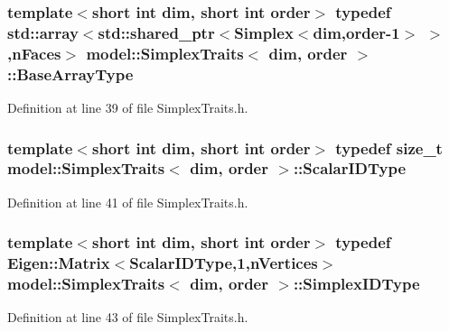 \subsubsection[{Base\+Array\+Type}]{\setlength{\rightskip}{0pt plus 5cm}template$<$short int dim, short int order$>$ typedef std\+::array$<$std\+::shared\+\_\+ptr$<${\bf Simplex}$<${\bf dim},order-\/1$>$ $>$,{\bf n\+Faces}$>$ {\bf model\+::\+Simplex\+Traits}$<$ {\bf dim}, order $>$\+::{\bf Base\+Array\+Type}}\label{structmodel_1_1_simplex_traits_a57cfde9abd77073f1512baf404bbb328}


Definition at line 39 of file Simplex\+Traits.\+h.

\hypertarget{structmodel_1_1_simplex_traits_ab229f3d4d4f2bf8205fa73777b4412a9}{}
\subsubsection[{Scalar\+I\+D\+Type}]{\setlength{\rightskip}{0pt plus 5cm}template$<$short int dim, short int order$>$ typedef size\+\_\+t {\bf model\+::\+Simplex\+Traits}$<$ {\bf dim}, order $>$\+::{\bf Scalar\+I\+D\+Type}}\label{structmodel_1_1_simplex_traits_ab229f3d4d4f2bf8205fa73777b4412a9}


Definition at line 41 of file Simplex\+Traits.\+h.

\hypertarget{structmodel_1_1_simplex_traits_aea38aba3da1babde2d5f0c62f7862eae}{}
\subsubsection[{Simplex\+I\+D\+Type}]{\setlength{\rightskip}{0pt plus 5cm}template$<$short int dim, short int order$>$ typedef Eigen\+::\+Matrix$<${\bf Scalar\+I\+D\+Type},1,{\bf n\+Vertices}$>$ {\bf model\+::\+Simplex\+Traits}$<$ {\bf dim}, order $>$\+::{\bf Simplex\+I\+D\+Type}}\label{structmodel_1_1_simplex_traits_aea38aba3da1babde2d5f0c62f7862eae}


Definition at line 43 of file Simplex\+Traits.\+h.



